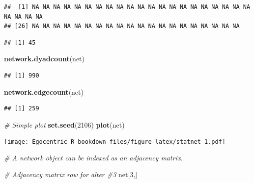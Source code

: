 \documentclass[
]{book}
\newenvironment{Shaded}{\begin{snugshade}}{\end{snugshade}}
\newcommand{\CommentTok}[1]{\textcolor[rgb]{0.56,0.35,0.01}{\textit{#1}}}
\newcommand{\DecValTok}[1]{\textcolor[rgb]{0.00,0.00,0.81}{#1}}
\newcommand{\FunctionTok}[1]{\textcolor[rgb]{0.13,0.29,0.53}{\textbf{#1}}}
\newcommand{\NormalTok}[1]{#1}
\newcommand{\OtherTok}[1]{\textcolor[rgb]{0.56,0.35,0.01}{#1}}
\newcommand{\SpecialCharTok}[1]{\textcolor[rgb]{0.81,0.36,0.00}{\textbf{#1}}}
\newcommand{\StringTok}[1]{\textcolor[rgb]{0.31,0.60,0.02}{#1}}
\begin{document}
\begin{verbatim}
##  [1] NA NA NA NA NA NA NA NA NA NA NA NA NA NA NA NA NA NA NA NA NA NA NA NA NA
## [26] NA NA NA NA NA NA NA NA NA NA NA NA NA NA NA NA NA NA NA NA
\end{verbatim}

\begin{Shaded}
\end{Shaded}

\begin{verbatim}
## [1] 45
\end{verbatim}

\begin{Shaded}
\begin{Highlighting}[]
\FunctionTok{network.dyadcount}\NormalTok{(net)}
\end{Highlighting}
\end{Shaded}

\begin{verbatim}
## [1] 990
\end{verbatim}

\begin{Shaded}
\begin{Highlighting}[]
\FunctionTok{network.edgecount}\NormalTok{(net)}
\end{Highlighting}
\end{Shaded}

\begin{verbatim}
## [1] 259
\end{verbatim}

\begin{Shaded}
\begin{Highlighting}[]
\CommentTok{\# Simple plot}
\FunctionTok{set.seed}\NormalTok{(}\DecValTok{2106}\NormalTok{)}
\FunctionTok{plot}\NormalTok{(net)}
\end{Highlighting}
\end{Shaded}

\texttt{[image: Egocentric\_R\_bookdown\_files/figure-latex/statnet-1.pdf]}

\begin{Shaded}
\begin{Highlighting}[]
\CommentTok{\# A network object can be indexed as an adjacency matrix.}

\CommentTok{\# Adjacency matrix row for alter \#3}
\NormalTok{net[}\DecValTok{3}\NormalTok{,]}
\end{Highlighting}
\end{Shaded}
\end{document}
